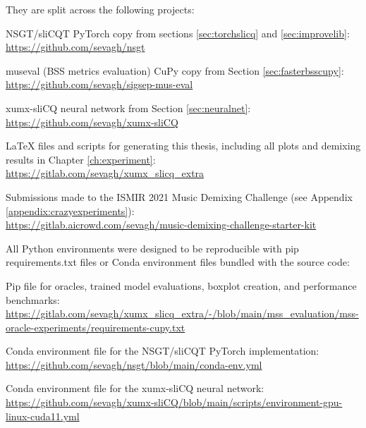 \documentclass[report.tex]{subfiles}
\begin{document}
\begin{appendices}
They are split across the following projects:
\begin{tight_itemize}
	\item
		NSGT/sliCQT PyTorch copy from sections \ref{sec:torchslicq} and \ref{sec:improvelib}:\\
		\url{https://github.com/sevagh/nsgt}
	\item
		museval (BSS metrics evaluation) CuPy copy from Section \ref{sec:fasterbsscupy}:\\
		\url{https://github.com/sevagh/sigsep-mus-eval}
	\item
		xumx-sliCQ neural network from Section \ref{sec:neuralnet}:\\
		\url{https://github.com/sevagh/xumx-sliCQ}
	\item
		LaTeX files and scripts for generating this thesis, including all plots and demixing results in Chapter \ref{ch:experiment}:\\
		\url{https://gitlab.com/sevagh/xumx_slicq_extra}
	\item
		Submissions made to the ISMIR 2021 Music Demixing Challenge (see Appendix \ref{appendix:crazyexperiments}):\\
		\url{https://gitlab.aicrowd.com/sevagh/music-demixing-challenge-starter-kit}
\end{tight_itemize}

All Python environments were designed to be reproducible with pip requirements.txt files or Conda environment files bundled with the source code:

\begin{tight_itemize}
	\item
		Pip file for oracles, trained model evaluations, boxplot creation, and performance benchmarks:\\
		\url{https://gitlab.com/sevagh/xumx_slicq_extra/-/blob/main/mss_evaluation/mss-oracle-experiments/requirements-cupy.txt}
	\item
		Conda environment file for the NSGT/sliCQT PyTorch implementation:\\
		\url{https://github.com/sevagh/nsgt/blob/main/conda-env.yml}
	\item
		Conda environment file for the xumx-sliCQ neural network:\\
		\href{https://github.com/sevagh/xumx-sliCQ/blob/main/scripts/environment-gpu-linux-cuda11.yml}{https://github.com/sevagh/xumx-sliCQ/blob/main/scripts/environment-gpu-linux-cuda11.yml}
\end{tight_itemize}


\end{appendices}
\end{document}
